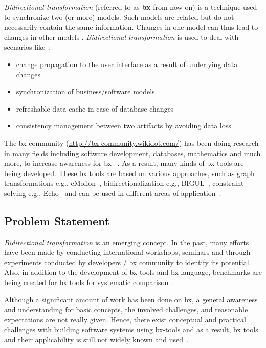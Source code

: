 \textit{Bidirectional transformation} (referred to as \textbf{bx} from now on) is a technique used to synchronize two (or more) models. Such models are related but do not necessarily contain the same information. Changes in one model can thus lead to changes in other models \cite{bx-grace}.
\newline\newline\textit{Bidirectional transformation} is used to deal with scenarios like~\cite{bx-theoryandappl}:\\

\begin{itemize}
	\item {change propagation to the user interface as a result of underlying data changes}	
	\item {synchronization of business/software models}
	\item {refreshable data-cache in case of database changes}
	\item {consistency management between two artifacts by avoiding data loss}
\end{itemize}

The bx community (\url{http://bx-community.wikidot.com/}) has been doing research in many fields including software development, databases, mathematics and much more, to increase awareness for bx ~\cite{bx-grace}\cite{bx-dagstuhl}. As a result, many kinds of bx tools are being developed. These bx tools are based on various approaches, such as graph transformations e.g., eMoflon~\cite{emoflon-part4}, bidirectionalization e.g., BIGUL~\cite{bigul}, constraint solving e.g., Echo~\cite{echo} and can be used in different areas of application~\cite{bx-community}.

\subsection{Problem Statement}\label{subsec:probstmt}
\textit{Bidirectional transformation} is an emerging concept. In the past, many efforts have been made by conducting international workshops, seminars and through experiments conducted by developers / bx community to identify its potential. Also, in addition to the development of bx tools and bx language, benchmarks are being created for bx tools for systematic comparison~\cite{benchmark-BX}.

Although a significant amount of work has been done on bx, a general awareness and understanding for basic concepts, the involved challenges, and reasonable expectations are not really given. Hence, there exist conceptual and practical challenges with building software systems using bx-tools and as a result, bx tools and their applicability is still not widely known and used~\cite{bx-theoryandappl}.

